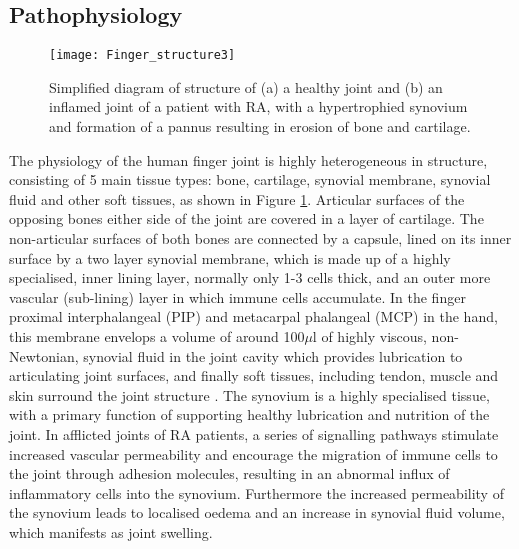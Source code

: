 \documentclass[twoside]{bhamthesis}
\theoremstyle{definition}
\begin{document}
\subsection{Pathophysiology}

\label{section:Pathophysiology}

\begin{figure}[!ht]
\centering\texttt{[image: Finger\_structure3]}
\caption{Simplified diagram of structure of (a) a healthy joint and (b) an  inflamed joint of a patient with RA, with a hypertrophied synovium  and formation of a pannus resulting in erosion of bone and cartilage.}
\label{fig:Diagram_of_joints}
\end{figure}

The physiology of the human finger joint is highly heterogeneous in structure, consisting of 5 main tissue types: bone, cartilage, synovial membrane, synovial fluid and other soft tissues, as shown in Figure \ref{fig:Diagram_of_joints}. Articular surfaces of the opposing bones either side of the joint are covered in a layer of cartilage. The non-articular surfaces of both bones are connected by a capsule, lined on its inner surface by a two layer synovial membrane, which is made up of a highly specialised, inner lining layer, normally only 1-3 cells thick, and an outer more vascular (sub-lining) layer in which immune cells accumulate. In  the finger proximal interphalangeal (PIP) and metacarpal phalangeal (MCP) in the hand, this membrane envelops a volume of around 100$\mu$l of highly viscous, non-Newtonian, synovial fluid in the joint cavity which provides lubrication to articulating joint surfaces, and finally soft tissues, including tendon, muscle and skin surround the joint structure \cite{orr2017synovial}. The synovium is a highly specialised tissue, with a primary function of supporting healthy lubrication and nutrition of the joint. In afflicted joints of RA patients, a series of signalling pathways stimulate increased vascular permeability and encourage the migration of immune cells to the joint through adhesion molecules, resulting in an abnormal influx of inflammatory cells into the synovium. Furthermore the increased permeability of the synovium leads to localised oedema and an increase in synovial fluid volume, which manifests as joint swelling.
\end{document}
